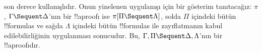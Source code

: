 \documentclass[../../../include/open-logic-section]{subfiles}
\begin{document}
 son derece kullanışlıdır. Onun yinelenen
uygulanışı için bir gösterim tanıtacağız: $\pi$, $\Gamma \Sequent \Delta$'nın
bir !!a{proof}{}ı ise $\pi[\Pi \Sequent \Lambda]$, solda $\Pi$ içindeki bütün
!!{formula}s ve sağda $\Lambda$ içindeki bütün !!{formula}s ile
zayıflatmanın kabul edilebilirliğinin uygulanması sonucudur. Bu, $\Gamma,
\Pi \Sequent \Delta, \Lambda$'nın bir !!a{proof}{}ıdır.
\end{document}
